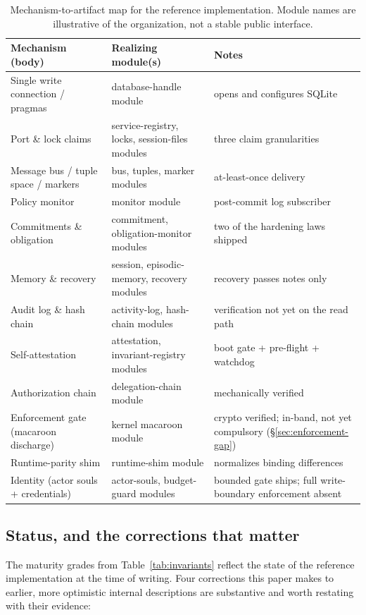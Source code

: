 \documentclass[11pt,a4paper]{article}
\theoremstyle{definition}
\theoremstyle{remark}
\begin{document}
\renewcommand{\arraystretch}{1.2}
\begin{table}[H]
\centering
\caption{Mechanism-to-artifact map for the reference implementation. Module names
are illustrative of the organization, not a stable public interface.}
\label{tab:appendix-map}
\small
\begin{tabular}{@{}p{52mm}p{52mm}p{42mm}@{}}
\toprule
\textbf{Mechanism (body)} & \textbf{Realizing module(s)} & \textbf{Notes} \\
\midrule
Single write connection / pragmas & database-handle module & opens and configures SQLite \\
Port \& lock claims & service-registry, locks, session-files modules & three claim granularities \\
Message bus / tuple space / markers & bus, tuples, marker modules & at-least-once delivery \\
Policy monitor & monitor module & post-commit log subscriber \\
Commitments \& obligation & commitment, obligation-monitor modules & two of the hardening laws shipped \\
Memory \& recovery & session, episodic-memory, recovery modules & recovery passes notes only \\
Audit log \& hash chain & activity-log, hash-chain modules & verification not yet on the read path \\
Self-attestation & attestation, invariant-registry modules & boot gate + pre-flight + watchdog \\
Authorization chain & delegation-chain module & mechanically verified \\
Enforcement gate (macaroon discharge) & kernel macaroon module & crypto verified; in-band, not yet compulsory (\S\ref{sec:enforcement-gap}) \\
Runtime-parity shim & runtime-shim module & normalizes binding differences \\
Identity (actor souls + credentials) & actor-souls, budget-guard modules & bounded gate ships; full write-boundary enforcement absent \\
\bottomrule
\end{tabular}
\end{table}

\subsection{Status, and the corrections that matter}

The maturity grades from Table~\ref{tab:invariants} reflect the state of the
reference implementation at the time of writing. Four corrections this paper makes
to earlier, more optimistic internal descriptions are substantive and worth
restating with their evidence:
\end{document}
